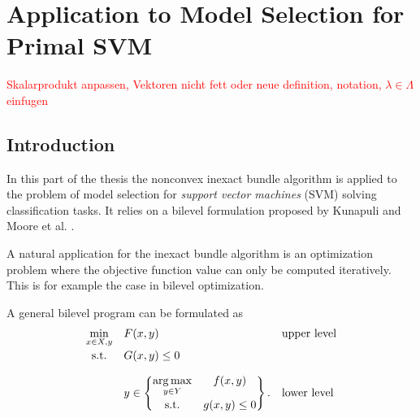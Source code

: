 \section{Application to Model Selection for Primal SVM}

\textcolor{red}{Skalarprodukt anpassen, Vektoren nicht fett oder neue definition, notation, \(\lambda \in \Lambda\) einfugen}

\subsection{Introduction}

In this part of the thesis the nonconvex inexact bundle algorithm is applied to the problem of model selection for \emph{support vector machines} (SVM) solving classification tasks.
It relies on a bilevel formulation proposed by Kunapuli \cite{Kunapuli2008} and Moore et al. \cite{Moore2011}.

A natural application for the inexact bundle algorithm is an optimization problem where the objective function value can only be computed iteratively. This is for example the case in bilevel optimization.

A general bilevel program can be formulated as \cite{Kunapuli2008}
\begin{equation}
	\begin{array}{cll}
	\displaystyle\min_{x \in X, y} & F(x,y) & \text{upper level} \vspace{0.5ex}\\
	\text{s.t.} & G(x,y) \leq 0 & \vspace{1em}\\
	& y \in \begin{Bmatrix} \displaystyle\argmax_{y\in Y} & f(x,y) \vspace{0.5ex}\\
	                        \text{s.t.} & g(x,y) \leq 0 
													\end{Bmatrix}. & \text{lower level}
	\end{array}
\end{equation}

